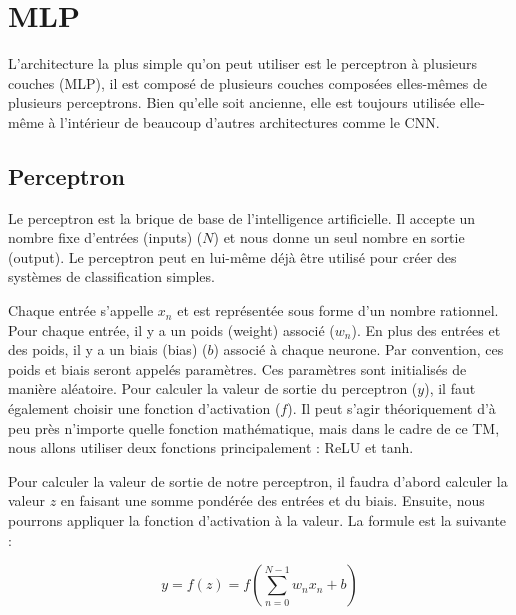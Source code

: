 \documentclass{article}
\begin{document}
\section{MLP}

L'architecture la plus simple qu'on peut utiliser est le perceptron à plusieurs couches (MLP), il est composé de plusieurs couches composées elles-mêmes de plusieurs perceptrons. Bien qu'elle soit ancienne, elle est toujours utilisée elle-même à l'intérieur de beaucoup d'autres architectures comme le CNN.

\subsection{Perceptron}

Le perceptron est la brique de base de l'intelligence artificielle. Il accepte un nombre fixe d'entrées (inputs) ($N$) et nous donne un seul nombre en sortie (output). Le perceptron peut en lui-même déjà être utilisé pour créer des systèmes de classification simples.

Chaque entrée s'appelle $x_n$ et est représentée sous forme d'un nombre rationnel. Pour chaque entrée, il y a un poids (weight) associé ($w_n$). En plus des entrées et des poids, il y a un biais (bias) ($b$) associé à chaque neurone. Par convention, ces poids et biais seront appelés paramètres. Ces paramètres sont initialisés de manière aléatoire. Pour calculer la valeur de sortie du perceptron ($y$), il faut également choisir une fonction d'activation ($f$). Il peut s'agir théoriquement d'à peu près n'importe quelle fonction mathématique, mais dans le cadre de ce TM, nous allons utiliser deux fonctions principalement : ReLU et tanh.

\medskip

Pour calculer la valeur de sortie de notre perceptron, il faudra d'abord calculer la valeur $z$ en faisant une somme pondérée des entrées et du biais. Ensuite, nous pourrons appliquer la fonction d'activation à la valeur. La formule est la suivante :

\[
y = f(z) = f\left(\sum_{n=0}^{N-1} w_n x_n + b\right)
\]
\end{document}
